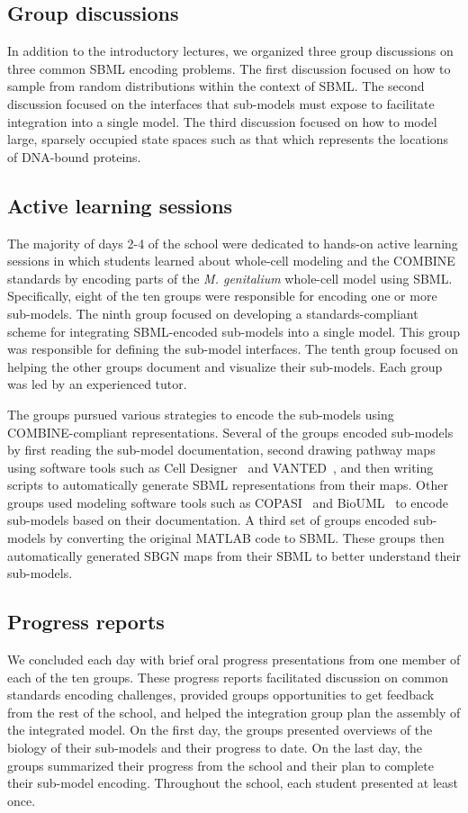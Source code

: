 \documentclass[journal,transmag]{IEEEtran}
\begin{document}
\subsection{Group discussions}
In addition to the introductory lectures, we organized three group discussions on three common SBML encoding problems. The first discussion focused on how to sample from random distributions within the context of SBML. The second discussion focused on the interfaces that sub-models must expose to facilitate integration into a single model. The third discussion focused on how to model large, sparsely occupied state spaces such as that which represents the locations of DNA-bound proteins.

\subsection{Active learning sessions}
The majority of days 2-4 of the school were dedicated to hands-on active learning sessions in which students learned about whole-cell modeling and the COMBINE standards by encoding parts of the \textit{M. genitalium} whole-cell model using SBML. Specifically, eight of the ten groups were responsible for encoding one or more sub-models. The ninth group focused on developing a standards-compliant scheme for integrating SBML-encoded sub-models into a single model. This group was responsible for defining the sub-model interfaces. The tenth group focused on helping the other groups document and visualize their sub-models. Each group was led by an experienced tutor.

The groups pursued various strategies to encode the sub-models using COMBINE-compliant representations. Several of the groups encoded sub-models by first reading the sub-model documentation, second drawing pathway maps using software tools such as Cell Designer~\cite{funahashi2008celldesigner} and VANTED~\cite{Rohn2012}, and then writing scripts to automatically generate SBML representations from their maps. Other groups used modeling software tools such as COPASI~\cite{Mendes2009} and BioUML~\cite{Kolpakov2006} to encode sub-models based on their documentation. A third set of groups encoded sub-models by converting the original MATLAB code to SBML. These groups then automatically generated SBGN maps from their SBML to better understand their sub-models.

\subsection{Progress reports}
We concluded each day with brief oral progress presentations from one member of each of the ten groups. These progress reports facilitated discussion on common standards encoding challenges, provided groups opportunities to get feedback from the rest of the school, and helped the integration group plan the assembly of the integrated model. On the first day, the groups presented overviews of the biology of their sub-models and their progress to date. On the last day, the groups summarized their progress from the school and their plan to complete their sub-model encoding. Throughout the school, each student presented at least once.
\end{document}
